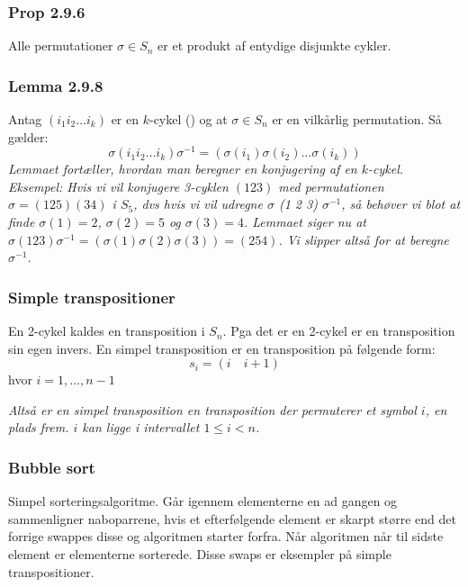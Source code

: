 \subsubsection{Prop 2.9.6}
Alle permutationer $\sigma \in S_n$ er et produkt af entydige disjunkte cykler.

\subsubsection{Lemma 2.9.8}
Antag $(i_1 i_2 \ldots i_k)$ er en $k$-cykel () og at $\sigma \in
S_n$ er en vilkårlig permutation. Så gælder:
\begin{equation*}
  \sigma(i_1 i_2 \ldots i_k)\sigma^{-1} =
  (\sigma(i_1)\sigma(i_2) \ldots \sigma(i_k))
\end{equation*}
\textit{Lemmaet fortæller, hvordan man beregner en konjugering af en $k$-cykel.
Eksempel: Hvis vi vil konjugere 3-cyklen $(1 2 3)$ med permutationen $\sigma =
(1 2 5)(3 4)$ i $S_5$, dvs hvis vi vil udregne $\sigma$ (1 2 3) $\sigma^{-1}$,
så behøver vi blot at finde $\sigma(1)=2$, $\sigma(2)=5$ og $\sigma(3)=4$.
Lemmaet siger nu at $\sigma (1 2 3) \sigma^{-1} = (\sigma(1) \sigma(2)
\sigma(3)) = (2 5 4)$. Vi slipper altså for at beregne $\sigma^{-1}$.}

\subsubsection{Simple transpositioner}
\label{simple_trans}
En 2-cykel kaldes en transposition i $S_n$. Pga det er en 2-cykel er en
transposition sin egen invers. En simpel transposition er en transposition på
følgende form:
\begin{equation*}
  s_i = (i \quad i + 1)
\end{equation*}
hvor $i = 1,\ldots, n-1$

\textit{Altså er en simpel transposition en transposition der permuterer et
symbol $i$, en plads frem. $i$ kan ligge i intervallet $1 \leq i < n $.}

\subsubsection{Bubble sort}
Simpel sorteringsalgoritme. Går igennem elementerne en ad gangen og sammenligner
naboparrene, hvis et efterfølgende element er skarpt større end det forrige
swappes disse og algoritmen starter forfra. Når algoritmen når til sidste
element er elementerne sorterede. Disse swaps er eksempler på simple
transpositioner.


